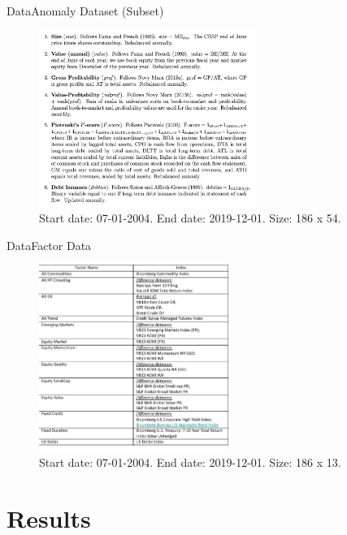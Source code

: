 \documentclass[dvipsnames,mathserif, handout]{beamer}
\begin{document}
{\begin{frame}{Data}{Anomaly Dataset (Subset)}
	\begin{figure}[!ht]
		\includegraphics[width=200pt]{anomaly_definitions_subset.pdf}
		\caption{\footnotesize Start date: 07-01-2004. End date: 2019-12-01. Size: 186 x 54.}
	\end{figure}
\end{frame}

\begin{frame}{Data}{Factor Data}
	\begin{figure}[!ht]
		\includegraphics[width=175pt]{FactorDefinitions.pdf}
		\caption{\footnotesize Start date: 07-01-2004. End date: 2019-12-01. Size: 186 x 13.}
	\end{figure}
\end{frame}

\section{Results}

}
\end{document}
